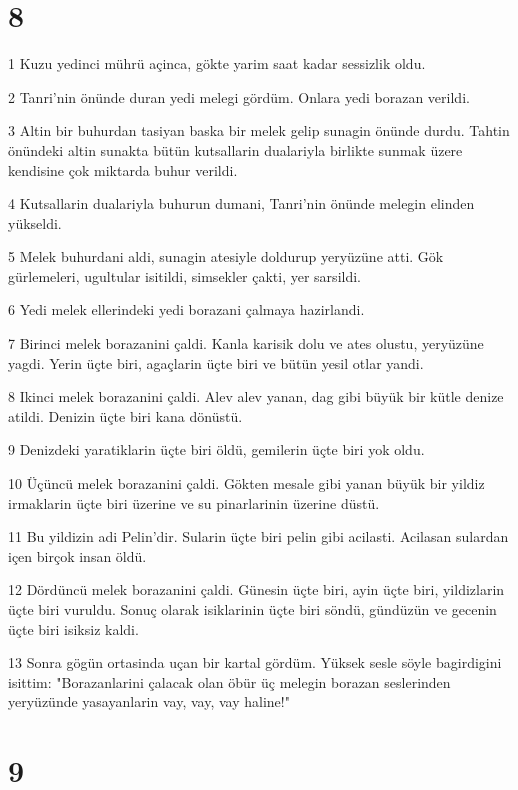 \chapter{8}

\par 1 Kuzu yedinci mührü açinca, gökte yarim saat kadar sessizlik oldu.
\par 2 Tanri'nin önünde duran yedi melegi gördüm. Onlara yedi borazan verildi.
\par 3 Altin bir buhurdan tasiyan baska bir melek gelip sunagin önünde durdu. Tahtin önündeki altin sunakta bütün kutsallarin dualariyla birlikte sunmak üzere kendisine çok miktarda buhur verildi.
\par 4 Kutsallarin dualariyla buhurun dumani, Tanri'nin önünde melegin elinden yükseldi.
\par 5 Melek buhurdani aldi, sunagin atesiyle doldurup yeryüzüne atti. Gök gürlemeleri, ugultular isitildi, simsekler çakti, yer sarsildi.
\par 6 Yedi melek ellerindeki yedi borazani çalmaya hazirlandi.
\par 7 Birinci melek borazanini çaldi. Kanla karisik dolu ve ates olustu, yeryüzüne yagdi. Yerin üçte biri, agaçlarin üçte biri ve bütün yesil otlar yandi.
\par 8 Ikinci melek borazanini çaldi. Alev alev yanan, dag gibi büyük bir kütle denize atildi. Denizin üçte biri kana dönüstü.
\par 9 Denizdeki yaratiklarin üçte biri öldü, gemilerin üçte biri yok oldu.
\par 10 Üçüncü melek borazanini çaldi. Gökten mesale gibi yanan büyük bir yildiz irmaklarin üçte biri üzerine ve su pinarlarinin üzerine düstü.
\par 11 Bu yildizin adi Pelin'dir. Sularin üçte biri pelin gibi acilasti. Acilasan sulardan içen birçok insan öldü.
\par 12 Dördüncü melek borazanini çaldi. Günesin üçte biri, ayin üçte biri, yildizlarin üçte biri vuruldu. Sonuç olarak isiklarinin üçte biri söndü, gündüzün ve gecenin üçte biri isiksiz kaldi.
\par 13 Sonra gögün ortasinda uçan bir kartal gördüm. Yüksek sesle söyle bagirdigini isittim: "Borazanlarini çalacak olan öbür üç melegin borazan seslerinden yeryüzünde yasayanlarin vay, vay, vay haline!"

\chapter{9}

